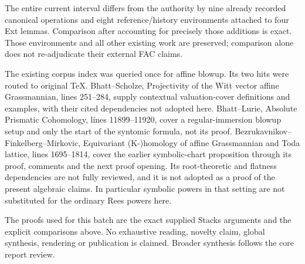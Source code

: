 The entire current interval differs from the authority by nine already recorded canonical operations and eight reference/history environments attached to four Ext lemmas. Comparison after accounting for precisely those additions is exact. Those environments and all other existing work are preserved; comparison alone does not re-adjudicate their external FAC claims.

The existing corpus index was queried once for affine blowup. Its two hits were routed to original TeX. Bhatt--Scholze, Projectivity of the Witt vector affine Grassmannian, lines 251--284, supply contextual valuation-cover definitions and examples, with their cited dependencies not adopted here. Bhatt--Lurie, Absolute Prismatic Cohomology, lines 11899--11920, cover a regular-immersion blowup setup and only the start of the syntomic formula, not its proof. Bezrukavnikov--Finkelberg--Mirkovic, Equivariant (K-)homology of affine Grassmannian and Toda lattice, lines 1695--1814, cover the earlier symbolic-chart proposition through its proof, comments and the next proof opening. Its root-theoretic and flatness dependencies are not fully reviewed, and it is not adopted as a proof of the present algebraic claims. In particular symbolic powers in that setting are not substituted for the ordinary Rees powers here.

The proofs used for this batch are the exact supplied Stacks arguments and the explicit comparisons above. No exhaustive reading, novelty claim, global synthesis, rendering or publication is claimed. Broader synthesis follows the core report review.
